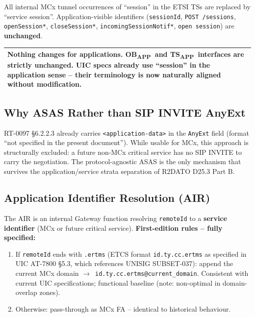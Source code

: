 \documentclass[11pt,a4paper]{article}
\newenvironment{notebox}{%
  \begin{center}\begin{tabular}{|p{0.93\textwidth}|}\hline\rowcolor{noteblue}
}{\\\hline\end{tabular}\end{center}}
\newcommand{\OBAPP}{OB\textsubscript{APP}}
\newcommand{\TSAPP}{TS\textsubscript{APP}}
\newcommand{\arr}{$\to$}
\begin{document}
All internal MCx tunnel occurrences of ``session'' in the ETSI TSs are replaced by
``service session''. Application-visible identifiers (\texttt{sessionId},
\texttt{POST /sessions}, \texttt{openSession*}, \texttt{closeSession*},
\texttt{incomingSessionNotif*}, \texttt{open session}) are \textbf{unchanged}.

\begin{notebox}
  \textbf{Nothing changes for applications.} \OBAPP\ and \TSAPP\ interfaces are
  strictly unchanged. UIC specs already use ``session'' in the application sense --
  their terminology is now naturally aligned without modification.
\end{notebox}

\subsection{Why ASAS Rather than SIP INVITE AnyExt}

RT-0097 §6.2.2.3 already carries \texttt{<application-data>} in the \texttt{AnyExt}
field (format ``not specified in the present document''). While usable for MCx, this
approach is structurally excluded: a future non-MCx critical service has no SIP INVITE
to carry the negotiation. The protocol-agnostic ASAS is the only mechanism that
survives the application/service strata separation of R2DATO D25.3 Part B.

\subsection{Application Identifier Resolution (AIR)}

The AIR is an internal Gateway function resolving \texttt{remoteId} to a
\textbf{service identifier} (MCx or future critical service).
\textbf{First-edition rules -- fully specified:}

\begin{enumerate}[leftmargin=2em]
  \item If \texttt{remoteId} ends with \texttt{.ertms} (ETCS format
    \texttt{id.ty.cc.ertms} as specified in UIC AT-7800 §5.3, which references
    UNISIG SUBSET-037): append the current MCx domain
    \arr\ \texttt{id.ty.cc.ertms@current\_domain}.
    Consistent with current UIC specifications; functional baseline (note: non-optimal
    in domain-overlap zones).
  \item Otherwise: pass-through as MCx FA -- identical to historical behaviour.
\end{enumerate}
\end{document}
